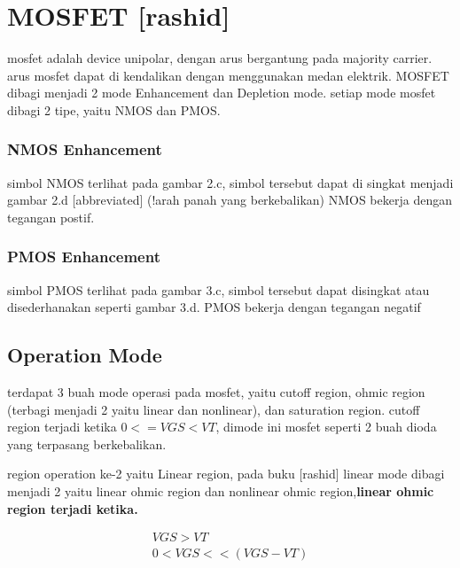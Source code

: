 \graphicspath{{./img/}}




\section{MOSFET [rashid]}

mosfet adalah device unipolar, dengan arus bergantung pada majority carrier. arus mosfet dapat di kendalikan
dengan menggunakan medan elektrik. MOSFET dibagi menjadi 2 mode Enhancement dan Depletion mode. setiap mode mosfet dibagi 
2 tipe, yaitu NMOS dan PMOS.


\subsubsection{NMOS Enhancement}
simbol NMOS terlihat pada gambar 2.c, simbol tersebut dapat di singkat menjadi gambar 2.d [abbreviated] (!arah panah yang berkebalikan)
NMOS bekerja dengan tegangan postif.

\subsubsection{PMOS Enhancement}
simbol PMOS terlihat pada gambar 3.c, simbol tersebut dapat disingkat atau disederhanakan seperti gambar 3.d. 
PMOS bekerja dengan tegangan negatif

\subsection{Operation Mode}
terdapat 3 buah mode operasi pada mosfet, yaitu cutoff region, ohmic region (terbagi menjadi 2 yaitu linear dan nonlinear),
dan saturation region. cutoff region terjadi ketika $0 <= VGS < VT$, dimode ini mosfet seperti 2 buah dioda yang terpasang 
berkebalikan. 

region operation ke-2 yaitu Linear region, pada buku [rashid] linear mode dibagi menjadi 2 yaitu 
linear ohmic region dan nonlinear ohmic region,\textbf{linear ohmic region terjadi ketika. } 

\begin{gather}
  VGS > VT  \\
  0 < VGS << (VGS-VT)  
\end{gather}

